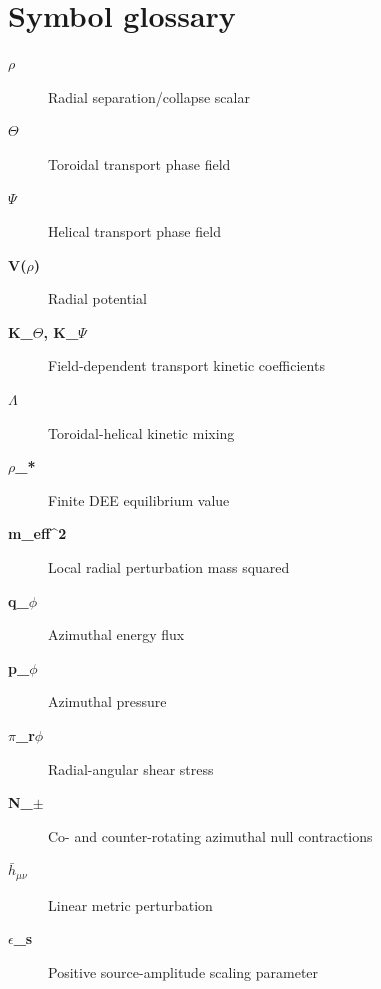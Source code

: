 \documentclass[aps,prd,preprint,nofootinbib,superscriptaddress]{revtex4-2}
\begin{document}
\section{Symbol glossary}

\begin{description}
\item[\textbf{$\rho$}] Radial separation/collapse scalar
\item[\textbf{$\Theta$}] Toroidal transport phase field
\item[\textbf{$\Psi$}] Helical transport phase field
\item[\textbf{V($\rho$)}] Radial potential
\item[\textbf{K\_$\Theta$, K\_$\Psi$}] Field-dependent transport kinetic coefficients
\item[\textbf{$\Lambda$}] Toroidal-helical kinetic mixing
\item[\textbf{$\rho$\_*}] Finite DEE equilibrium value
\item[\textbf{m\_eff\textasciicircum{}2}] Local radial perturbation mass squared
\item[\textbf{q\_$\phi$}] Azimuthal energy flux
\item[\textbf{p\_$\phi$}] Azimuthal pressure
\item[\textbf{$\pi$\_r$\phi$}] Radial-angular shear stress
\item[\textbf{N\_$\pm$}] Co- and counter-rotating azimuthal null contractions
\item[\textbf{$\bar h_{\mu\nu}$}] Linear metric perturbation
\item[\textbf{$\epsilon$\_s}] Positive source-amplitude scaling parameter
\end{description}
\end{document}
